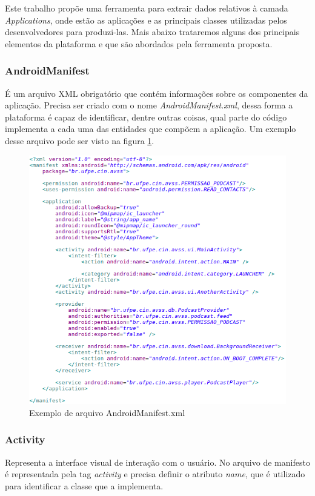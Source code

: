 \documentclass[a4paper,12pt]{article}
\begin{document}
Este trabalho propõe uma ferramenta para extrair dados relativos à camada \textit{Applications}, onde estão as aplicações e as principais classes utilizadas pelos desenvolvedores para produzi-las. Mais abaixo trataremos alguns dos principais elementos da plataforma e que são abordados pela ferramenta proposta.

\subsubsection{AndroidManifest}
É um arquivo XML obrigatório que contém informações sobre os componentes da aplicação. Precisa ser criado com o nome \textit{AndroidManifest.xml}, dessa forma a plataforma é capaz de identificar, dentre outras coisas, qual parte do código implementa a cada uma das entidades que compõem a aplicação. Um exemplo desse arquivo pode ser visto na figura \ref{fig:manifest}.

 \begin{figure}[h]
 \centering
 \includegraphics[width=\linewidth]{imgs/manifest.png}
 \caption{Exemplo de arquivo AndroidManifest.xml}
 \label{fig:manifest}
 \end{figure}



\subsubsection{Activity}
Representa a interface visual de interação com o usuário. No arquivo de manifesto é representada pela tag \textit{activity} e precisa definir o atributo \textit{name}, que é utilizado para identificar a classe que a implementa.\\
\end{document}
